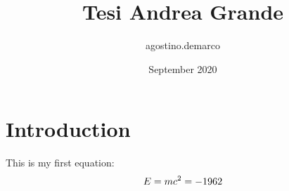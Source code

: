 \documentclass{article}
\title{Tesi Andrea Grande}
\author{agostino.demarco}
\date{September 2020}
\begin{document}
\maketitle



\section{Introduction}

This is my first equation:
\begin{equation}
E = m c^2 = -1962
\end{equation}
\end{document}
